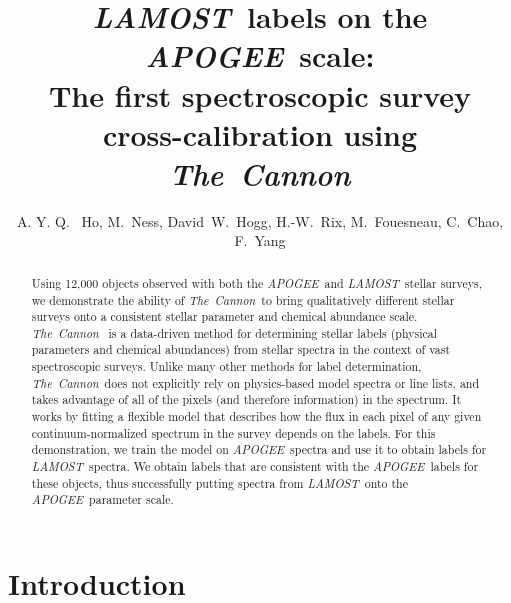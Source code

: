 \documentclass[12pt, preprint]{aastex}
\newcommand{\tc}{\textsl{The~Cannon}}
\newcommand{\apogee}{\textsl{APOGEE}}
\newcommand{\lamost}{\textsl{LAMOST}}
\begin{document}
\title{\lamost\ labels on the \apogee\ scale: \\ The first spectroscopic survey cross-calibration using \tc}
\author{A. Y. Q. ~Ho,
M.~Ness,
David~W.~Hogg, 
H.-W.~Rix,
M.~Fouesneau,
C.~Chao,
F.~Yang
}


\begin{abstract}

Using 12,000 objects observed with both the \apogee\ and \lamost\ stellar
surveys, we demonstrate the ability of \tc\ to bring qualitatively 
different stellar surveys onto a consistent stellar parameter and chemical 
abundance scale. 
\tc\ \citep{ness2015} is a data-driven method for determining stellar labels 
(physical parameters and chemical abundances) from stellar spectra in the 
context of vast spectroscopic surveys. 
Unlike many other methods for label determination, \tc\ does not 
explicitly rely on physics-based model spectra or line lists, and takes 
advantage of all of the pixels (and therefore information) in the spectrum. 
It works by fitting a flexible model that describes how the flux in each 
pixel of any given continuum-normalized spectrum in the survey depends on 
the labels. 
For this demonstration, we train the model on \apogee\ spectra and use it
to obtain labels for \lamost\ spectra. We obtain labels that are consistent
with the \apogee\ labels for these objects, thus successfully putting spectra
from \lamost\ onto the \apogee\ parameter scale. 

\end{abstract}


\section{Introduction}
\end{document}
